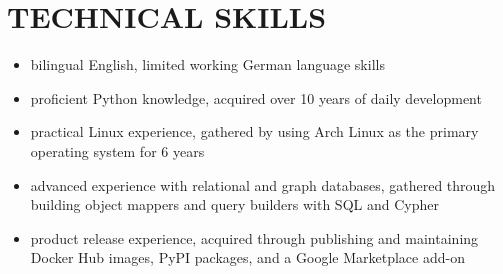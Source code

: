 \documentclass{article}
\begin{document}



\section{TECHNICAL SKILLS}
\begin{itemize}
  \itemsep0em
  \item bilingual English, limited working German language skills
  \item proficient Python knowledge, acquired over 10 years of daily development
  \item practical Linux experience, gathered by using Arch Linux as the primary operating system for 6 years
  \item advanced experience with relational and graph databases, gathered through building object mappers and query builders with SQL and Cypher
  \item product release experience, acquired through publishing and maintaining Docker Hub images, PyPI packages, and a Google Marketplace add-on
\end{itemize}
\end{document}

